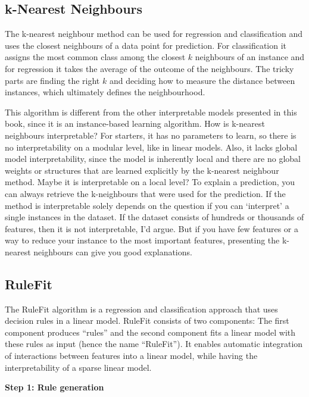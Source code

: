 \documentclass[12pt,]{krantz}
\theoremstyle{definition}
\theoremstyle{definition}
\theoremstyle{definition}
\theoremstyle{remark}
\begin{document}
\subsection{k-Nearest Neighbours}\label{k-nearest-neighbours}

The k-nearest neighbour method can be used for regression and
classification and uses the closest neighbours of a data point for
prediction. For classification it assigns the most common class among
the closest \(k\) neighbours of an instance and for regression it takes
the average of the outcome of the neighbours. The tricky parts are
finding the right \(k\) and deciding how to measure the distance between
instances, which ultimately defines the neighbourhood.

This algorithm is different from the other interpretable models
presented in this book, since it is an instance-based learning
algorithm. How is k-nearest neighbours interpretable? For starters, it
has no parameters to learn, so there is no interpretability on a modular
level, like in linear models. Also, it lacks global model
interpretability, since the model is inherently local and there are no
global weights or structures that are learned explicitly by the
k-nearest neighbour method. Maybe it is interpretable on a local level?
To explain a prediction, you can always retrieve the k-neighbours that
were used for the prediction. If the method is interpretable solely
depends on the question if you can `interpret' a single instances in the
dataset. If the dataset consists of hundreds or thousands of features,
then it is not interpretable, I'd argue. But if you have few features or
a way to reduce your instance to the most important features, presenting
the k-nearest neighbours can give you good explanations.

\subsection{RuleFit}\label{rulefit}

The RuleFit algorithm \citep{friedman2008predictive} is a regression and
classification approach that uses decision rules in a linear model.
RuleFit consists of two components: The first component produces
``rules'' and the second component fits a linear model with these rules
as input (hence the name ``RuleFit''). It enables automatic integration
of interactions between features into a linear model, while having the
interpretability of a sparse linear model.

\textbf{Step 1: Rule generation}
\end{document}
